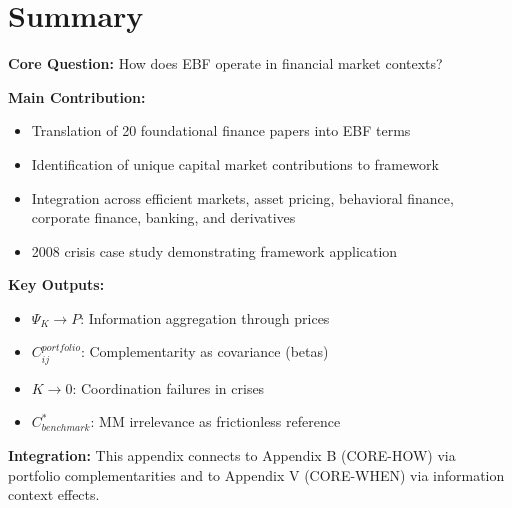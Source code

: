 %
%

\section{Summary}
\label{sec:Y-summary}

\begin{tcolorbox}[colback=green!10!white, colframe=green!75!black,
    title=\textbf{Appendix Y: Summary}]

\textbf{Core Question:} How does EBF operate in financial market contexts?

\textbf{Main Contribution:}
\begin{itemize}[nosep]
    \item Translation of 20 foundational finance papers into EBF terms
    \item Identification of unique capital market contributions to framework
    \item Integration across efficient markets, asset pricing, behavioral finance,
          corporate finance, banking, and derivatives
    \item 2008 crisis case study demonstrating framework application
\end{itemize}

\textbf{Key Outputs:}
\begin{itemize}[nosep]
    \item $\Psi_K \to P$: Information aggregation through prices
    \item $C_{ij}^{portfolio}$: Complementarity as covariance (betas)
    \item $K \to 0$: Coordination failures in crises
    \item $C^*_{benchmark}$: MM irrelevance as frictionless reference
\end{itemize}

\textbf{Integration:} This appendix connects to Appendix B (CORE-HOW) via
portfolio complementarities and to Appendix V (CORE-WHEN) via information
context effects.

\end{tcolorbox}


